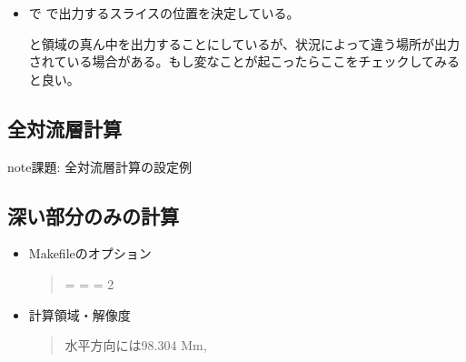 \documentclass[letterpaper,10pt,dvipdfmx,report]{sphinxmanual}
\begin{document}
\begin{itemize}
\begin{description}
\end{description}

\item {} \begin{description}
\sphinxAtStartPar
{} で  で出力するスライスの位置を決定している。

\sphinxAtStartPar
と領域の真ん中を出力することにしているが、状況によって違う場所が出力されている場合がある。もし変なことが起こったらここをチェックしてみると良い。

\end{description}

\end{itemize}


\subsection{全対流層計算}
\label{\detokenize{typical_case:id9}}
\begin{sphinxadmonition}{note}{\label{\detokenize{typical_case:id10}}課題:}
\sphinxAtStartPar
全対流層計算の設定例
\end{sphinxadmonition}


\subsection{深い部分のみの計算}
\label{\detokenize{typical_case:id11}}\begin{itemize}
\item {} 
\sphinxAtStartPar
Makefileのオプション
\begin{quote}

\begin{sphinxVerbatim}[commandchars=\\\{\}]
= \PYGZhy{} 
= \PYGZhy{} 
= \PYGZhy{}2 
\end{sphinxVerbatim}
\end{quote}

\item {} 
\sphinxAtStartPar
計算領域・解像度
\begin{quote}

\sphinxAtStartPar
水平方向には98.304 Mm,
\end{quote}

\end{itemize}
\end{document}
